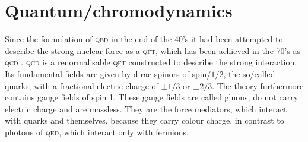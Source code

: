 \documentclass[../../index.tex]{subfiles}
\begin{document}
\section{Quantum\-/chromodynamics}
\label{sec:quantumchromodynamics}
Since the formulation of \textsc{qed} in the end of the 40's it had been
attempted to describe the strong nuclear force as a \textsc{qft}, which has been
achieved in the 70's as \textsc{qcd}
\cite{GellMann1972,Fritzsch1973,Gross1973,Politzer1973,Weinberg1973}.
\textsc{qcd} is a renormalisable \textsc{qft} constructed to describe the strong
interaction. Its fundamental fields are given by dirac spinors of spin\-/$1/2$,
the so\-/called quarks, with a fractional electric charge of $\pm 1/3$ or $\pm
2/3$. The theory furthermore contains gauge fields of spin 1. These gauge fields
are called gluons, do not carry electric charge and are massless. They are the
force mediators, which interact with quarks and themselves, because they carry
colour charge, in contrast to photons of \textsc{qed}, which interact only with
fermions. %
\end{document}
